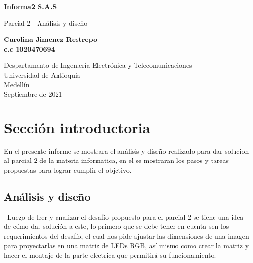 \documentclass{article}
\begin{document}
\begin{titlepage}
    \begin{center}
        \vspace*{1cm}
            
        \Huge
        \textbf{Informa2 S.A.S}
            
        \vspace{0.5cm}
        \LARGE
        Parcial 2 - Análisis y diseño 
            
        \vspace{1.5cm}
            
        \textbf{Carolina Jimenez Restrepo}\\
          \textbf{c.c 1020470694}
            
        \vfill
            
        \vspace{0.8cm}
            
        \Large
        Despartamento de Ingeniería Electrónica y Telecomunicaciones\\
        Universidad de Antioquia\\
        Medellín\\
        Septiembre de 2021
            
    \end{center}
\end{titlepage}

\tableofcontents
\newpage
\section{Sección introductoria}\label{intro}
En el presente informe se mostrara el análisis y diseño realizado para dar solucion al parcial 2 de la materia informatica, en el se mostraran los pasos y tareas propuestas para lograr cumplir el objetivo.

\subsection{Análisis y diseño}
\
Luego de leer y analizar el desafío propuesto para el parcial 2 se tiene una idea de cómo dar solución a este, lo primero que se debe tener en cuenta son los requerimientos del desafío, el cual nos pide ajustar las dimensiones de una imagen para proyectarlas en una matriz de LEDs RGB, así mismo como crear la matriz y hacer el montaje de la parte eléctrica que permitirá su funcionamiento.\\
\end{document}
